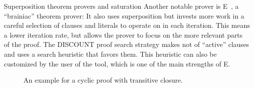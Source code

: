 \begin{paragraph}{Superposition theorem provers and saturation}
Another notable prover is E~\cite{AIC2002:Schulz}, a ``brainiac'' theorem prover:
It also uses superposition but invests more work in a careful selection of clauses and literals to operate on in each iteration.
This means a lower iteration rate, but allows the prover to focus on the more relevant parts of the proof.
The DISCOUNT proof search strategy makes not of ``active'' clauses and uses a search heuristic that favors them.
This heuristic can also be customized by the user of the tool, which is one of the main strengths of E.
\end{paragraph}

\begin{figure}

\caption{An example for a cyclic proof with transitive closure.}
\label{b2:tc-cyclic-example}
\end{figure}

